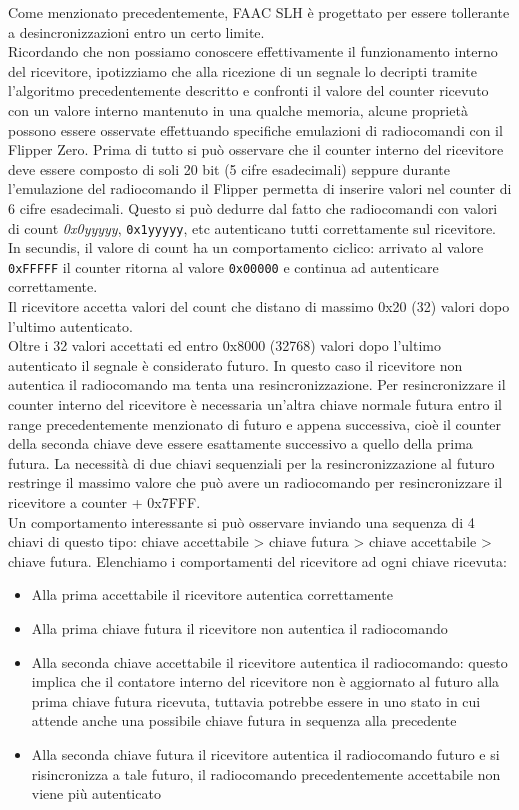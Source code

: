 Come menzionato precedentemente, FAAC SLH è progettato per essere tollerante a desincronizzazioni entro un certo limite.\\
Ricordando che non possiamo conoscere effettivamente il funzionamento interno del ricevitore, ipotizziamo che alla ricezione di un segnale lo decripti tramite l’algoritmo precedentemente descritto e confronti il valore del counter ricevuto con un valore interno mantenuto in una qualche memoria, alcune proprietà possono essere osservate effettuando specifiche emulazioni di radiocomandi con il Flipper Zero.
Prima di tutto si può osservare che il counter interno del ricevitore deve essere composto di soli 20 bit (5 cifre esadecimali) seppure durante l’emulazione del radiocomando il Flipper permetta di inserire valori nel counter di 6 cifre esadecimali. Questo si può dedurre dal fatto che radiocomandi con valori di count \textsl{0x0yyyyy}, \texttt{0x1yyyyy}, etc autenticano tutti correttamente sul ricevitore.\\
In secundis, il valore di count ha un comportamento ciclico: arrivato al valore \texttt{0xFFFFF} il counter ritorna al valore \texttt{0x00000} e continua ad autenticare correttamente.\\
Il ricevitore accetta valori del count che distano di massimo 0x20 (32) valori dopo l’ultimo autenticato.\\
Oltre i 32 valori accettati ed entro 0x8000 (32768) valori dopo l’ultimo autenticato il segnale è considerato futuro. In questo caso il ricevitore non autentica il radiocomando ma tenta una resincronizzazione. Per resincronizzare il counter interno del ricevitore è necessaria un’altra chiave normale futura entro il range precedentemente menzionato di futuro e appena successiva, cioè il counter della seconda chiave deve essere esattamente successivo a quello della prima futura. La necessità di due chiavi sequenziali per la resincronizzazione al futuro restringe il massimo valore che può avere un radiocomando per resincronizzare il ricevitore a counter + 0x7FFF.\\
Un comportamento interessante si può osservare inviando una sequenza di 4 chiavi di questo tipo: chiave accettabile > chiave futura > chiave accettabile > chiave futura. Elenchiamo i comportamenti del ricevitore ad ogni chiave ricevuta:
\begin{itemize}
  \item Alla prima accettabile il ricevitore autentica correttamente
  \item Alla prima chiave futura il ricevitore non autentica il radiocomando
  \item Alla seconda chiave accettabile il ricevitore autentica il radiocomando: questo implica che il contatore interno del ricevitore non è aggiornato al futuro alla prima chiave futura ricevuta, tuttavia potrebbe essere in uno stato in cui attende anche una possibile chiave futura in sequenza alla precedente
  \item Alla seconda chiave futura il ricevitore autentica il radiocomando futuro e si risincronizza a tale futuro, il radiocomando precedentemente accettabile non viene più autenticato
\end{itemize}
